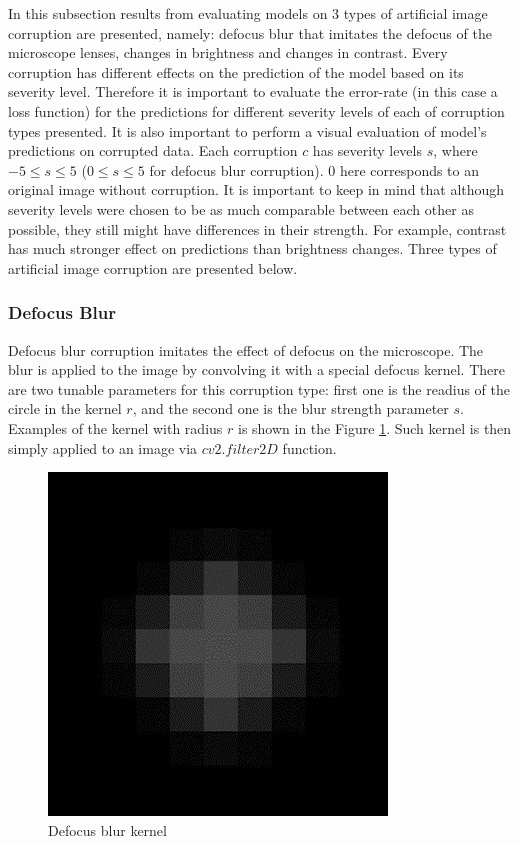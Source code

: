 
In this subsection results from evaluating models on 3 types of artificial image corruption are presented, namely: defocus blur that imitates the defocus of the microscope lenses, changes in brightness and changes in contrast. Every corruption  has different effects on the prediction of the model based on its severity level. Therefore it is important to evaluate the error-rate (in this case a loss function) for the predictions for different severity levels of each of corruption types presented. It is also important to perform a visual evaluation of model's predictions on corrupted data. Each corruption $c$ has severity levels $s$, where $-5 \leq s \leq 5$ ($0 \leq s \leq 5$ for defocus blur corruption). $0$ here corresponds to an original image without corruption. It is important to keep in mind that although severity levels were chosen to be as much comparable between each other as possible, they still might have differences in their strength. For example, contrast has much stronger effect on predictions than brightness changes. Three types of artificial image corruption are presented below.

\subsubsection{Defocus Blur}
Defocus blur corruption imitates the effect of defocus on the microscope. The blur is applied to the image by convolving it with a special defocus kernel. There are two tunable parameters for this corruption type: first one is the readius of the circle in the kernel $r$, and the second one is the blur strength parameter $s$. Examples of the kernel with radius $r$ is shown in the Figure \ref{fig:defocus-blur-kernel}. Such kernel is then simply applied to an image via $cv2.filter2D$ function.

\begin{figure}[htb]
	\begin{center}
		\includegraphics[width=0.2\linewidth]{bilder/stability/defocus-blur-kernel.png}
		\caption{Defocus blur kernel}\label{fig:defocus-blur-kernel}
	\end{center}
\end{figure}

